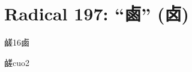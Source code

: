 
\section*{Radical 197: ``⿄'' (卤)}

\begin{Entry}{鹾}{16}{⿄}
  \begin{Phonetics}{鹾}{cuo2}
  \end{Phonetics}
\end{Entry}


